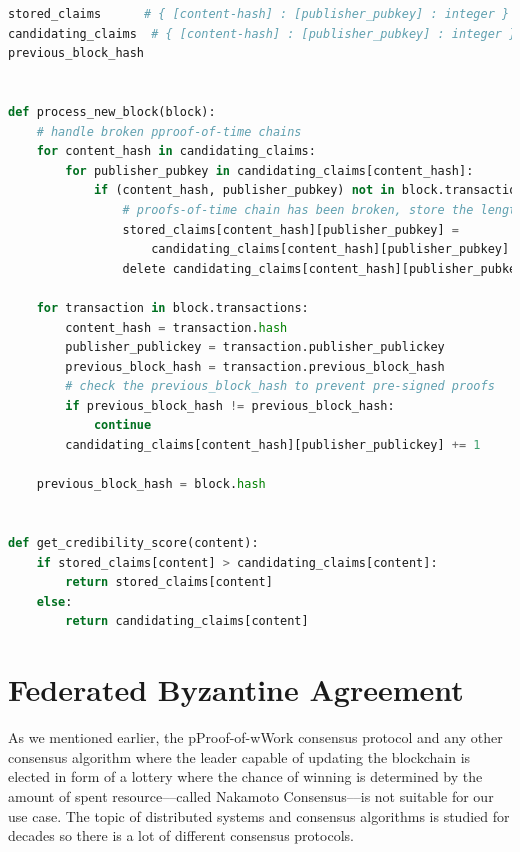 \begin{lstlisting}[language=Python, caption=Processing new block, label=listing_process_new_block,float,floatplacement=H]
stored_claims      # { [content-hash] : [publisher_pubkey] : integer }
candidating_claims  # { [content-hash] : [publisher_pubkey] : integer }
previous_block_hash


def process_new_block(block):
    # handle broken pproof-of-time chains
    for content_hash in candidating_claims:
        for publisher_pubkey in candidating_claims[content_hash]:
            if (content_hash, publisher_pubkey) not in block.transactions:
                # proofs-of-time chain has been broken, store the length
                stored_claims[content_hash][publisher_pubkey] = 
                    candidating_claims[content_hash][publisher_pubkey]
                delete candidating_claims[content_hash][publisher_pubkey]

    for transaction in block.transactions:
        content_hash = transaction.hash
        publisher_publickey = transaction.publisher_publickey
        previous_block_hash = transaction.previous_block_hash
        # check the previous_block_hash to prevent pre-signed proofs
        if previous_block_hash != previous_block_hash:
            continue
        candidating_claims[content_hash][publisher_publickey] += 1

    previous_block_hash = block.hash


def get_credibility_score(content):
    if stored_claims[content] > candidating_claims[content]:
        return stored_claims[content]
    else:
        return candidating_claims[content]

\end{lstlisting}




\section{Federated Byzantine Agreement}
\label{FBA}
As we mentioned earlier, the pProof-of-wWork consensus protocol and any other consensus algorithm where the leader capable of updating the blockchain is elected in form of a lottery where the chance of winning is determined by the amount of spent resource––called Nakamoto Consensus––is not suitable for our use case. The topic of distributed systems and consensus algorithms is studied for decades so there is a lot of different consensus protocols.

